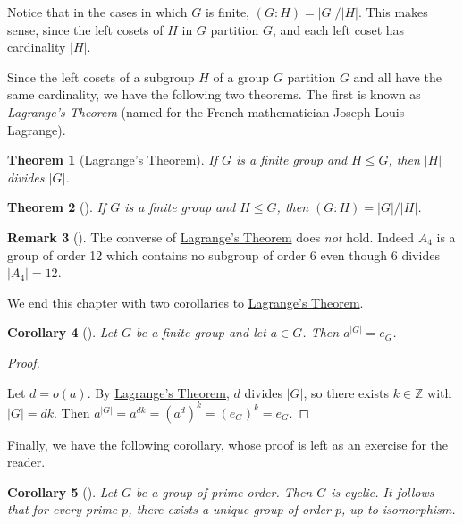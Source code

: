 \documentclass[10pt,openany,oneside]{book}
\theoremstyle{plain}
\newtheorem{theorem}{Theorem}[section]
\newtheorem{corollary}[theorem]{Corollary}
\theoremstyle{definition}
\theoremstyle{definition}
\newtheorem{remark}[theorem]{Remark}
\theoremstyle{definition}
\theoremstyle{definition}
\numberwithin{equation}{section}
\def\Z{\mathbb{Z}}
\begin{document}
Notice that in the cases in which \(G\) is finite, \((G:H)=|G|/|H|\). This makes sense, since the left cosets of \(H\) in \(G\) partition \(G\), and each left coset has cardinality \(|H|\).%
\par
Since the left cosets of a subgroup \(H\) of a group \(G\) partition \(G\) and all have the same cardinality, we have the following two theorems. The first is known as \emph{Lagrange's Theorem} (named for the French mathematician Joseph-Louis Lagrange).%
\begin{theorem}[{Lagrange's Theorem}]\label{lagrange}
If \(G\) is a finite group and \(H\leq G\), then \(|H|\) divides \(|G|\).%
\end{theorem}
\begin{theorem}[{}]\label{indexfin}
If \(G\) is a finite group and \(H\leq G\), then \((G:H)=|G|/|H|\).%
\end{theorem}
\begin{remark}[]\label{remark-42}
The converse of \hyperref[lagrange]{Lagrange's Theorem} does \emph{not} hold. Indeed \(A_4\) is a group of order 12 which contains no subgroup of order \(6\) even though \(6\) divides \(|A_4|=12\).%
\end{remark}
We end this chapter with two corollaries to \hyperref[lagrange]{Lagrange's Theorem}.%
\begin{corollary}[{}]\label{corollary-6}
Let \(G\) be a finite group and let \(a\in G\). Then \(a^{|G|}=e_G\).%
\end{corollary}
\begin{proof}\hypertarget{proof-38}{}
Let \(d=o(a)\). By \hyperref[lagrange]{Lagrange's Theorem}, \(d\) divides \(|G|\), so there exists \(k\in \Z\) with \(|G|=dk\). Then \(a^{|G|}=a^{dk}=(a^d)^k=(e_G)^k=e_G.\)%
\end{proof}
Finally, we have the following corollary, whose proof is left as an exercise for the reader.%
\begin{corollary}[{}]\label{pcyc}
Let \(G\) be a group of prime order. Then \(G\) is cyclic. It follows that for every prime \(p\), there exists a unique group of order \(p\), up to isomorphism.%
\end{corollary}
\typeout{************************************************}
\typeout{************************************************}
\end{document}

